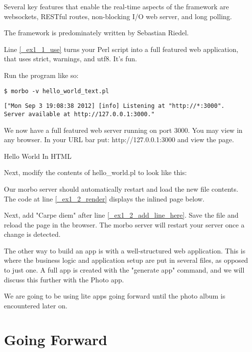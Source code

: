 \documentclass[14pt]{extreport}
\begin{document}
Several key features that enable the real-time aspects of the framework are
websockets, RESTful routes, non-blocking I/O web server, and long polling.

The framework is predominately written by Sebastian Riedel.



Line \ref{_ex1_1_use} turns your Perl script into a full featured web
application, that uses strict, warnings, and utf8. It's fun.

Run the program like so:

\begin{lstlisting}[style=BashInputStyle]
$ morbo -v hello_world_text.pl
\end{lstlisting}

\begin{lstlisting}[style=BashOutputStyle]
["Mon Sep 3 19:08:38 2012] [info] Listening at "http://*:3000".
Server available at http://127.0.0.1:3000."
\end{lstlisting}

We now have a full featured web server running on port 3000. You may view in
any browser. In your URL bar put: http://127.0.0.1:3000 and view the page.

{\Large Hello World In HTML}

Next, modify the contents of hello\_world.pl to look like this:



Our morbo server should automatically restart and load the new file contents.
The code at line \ref{_ex1_2_render} displays the inlined page below.

Next, add "Carpe diem" after line \ref{_ex1_2_add_line_here}. Save the file and
reload the page in the browser. The morbo server will restart your server once
a change is detected.

The other way to build an app is with a well-structured web application. This
is where the business logic and application setup are put in several files, as
opposed to just one.  A full app is created with the "generate app" command,
and we will discuss this further with the Photo app.

We are going to be using lite apps going forward until the photo album is
encountered later on.

\chapter*{Going Forward}
\end{document}
